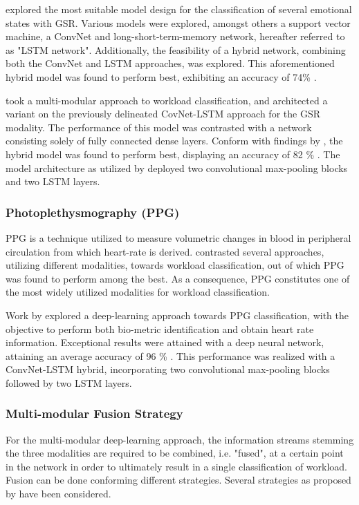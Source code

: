 \documentclass[12pt]{article}
\begin{document}
 explored the most suitable model design for the classification of several emotional states with GSR. Various models were explored, amongst others a support vector machine, a ConvNet and long-short-term-memory network, hereafter referred to as "LSTM network". Additionally, the feasibility of a hybrid network, combining both the ConvNet and LSTM approaches, was explored. This aforementioned hybrid model was found to perform best, exhibiting an accuracy of 74\% \cite{sun2019hybrid}. 

 took a multi-modular approach to workload classification, and architected a variant on the previously delineated CovNet-LSTM approach for the GSR modality. The performance of this model was contrasted with a network consisting solely of fully connected dense layers. Conform with findings by  , the hybrid model was found to perform best, displaying an accuracy of 82 \% \cite{dolmans2020perceived}. The model architecture as utilized by  deployed two convolutional max-pooling blocks and two LSTM layers.

\subsubsection{Photoplethysmography (PPG)}
PPG is a technique utilized to measure volumetric changes in blood in peripheral circulation from which heart-rate is derived.  contrasted several approaches, utilizing different modalities, towards workload classification, out of which PPG was found to perform among the best. As a consequence, PPG constitutes one of the most widely utilized modalities for workload classification. 

Work by  explored a deep-learning approach towards PPG classification, with the objective to perform both bio-metric identification and obtain heart rate information. Exceptional results were attained with a deep neural network, attaining an average accuracy of 96 \% \cite{biswas2019cornet}. This performance was realized with a ConvNet-LSTM hybrid, incorporating two convolutional max-pooling blocks followed by two LSTM layers. 

\subsubsection{Multi-modular Fusion Strategy}  
For the multi-modular deep-learning approach, the information streams stemming the three modalities are required to be combined, i.e. "fused", at a certain point in the network in order to ultimately result in a single classification of workload. Fusion can be done conforming different strategies. Several strategies as proposed by  have been considered.
\end{document}
